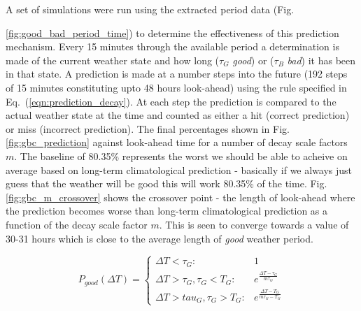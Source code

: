 {A set of simulations were run using the extracted period data (Fig. {\ref{fig:good_bad_period_time}) to determine the effectiveness of this prediction mechanism. Every 15 minutes through the available period a determination is made of the current weather state and how long ($\tau_G$ \emph{good}) or ($\tau_B$ \emph{bad}) it has been in that state. A prediction is made at a number steps into the future (192 steps of 15 minutes constituting upto 48 hours look-ahead) using the rule specified in Eq.~(\ref{eqn:prediction_decay}). At each step the prediction is compared to the actual weather state at the time and counted as either a hit (correct prediction) or miss (incorrect prediction). The final percentages shown in Fig. \ref{fig:gbc_prediction} against look-ahead time for a number of decay scale factors $m$. The baseline of 80.35\% represents the worst we should be able to acheive on average based on long-term climatological prediction - basically if we always just guess that the weather will be good this will work 80.35\% of the time. Fig. \ref{fig:gbc_m_crossover} shows the crossover point - the length of look-ahead where the prediction becomes worse than long-term climatological prediction as a function of the decay scale factor $m$. This is seen to converge towards a value of 30-31 hours which is close to the average length of \emph{good} weather period.

\begin{equation}
\label{eqn:prediction_decay}
P_{good}(\Delta T) = 
\begin{cases} 
\Delta T < \tau_G : & 1   \\ 
\Delta T > \tau_G, \tau_G < T_G : & e^{\frac{\Delta T-\tau_G}{m \tau_G}} \\
\Delta T > tau_G , \tau_G > T_G : & e^{\frac{\Delta T-T_G}{m \tau_G-T_G}}
\end{cases}
\end{equation}



}}
